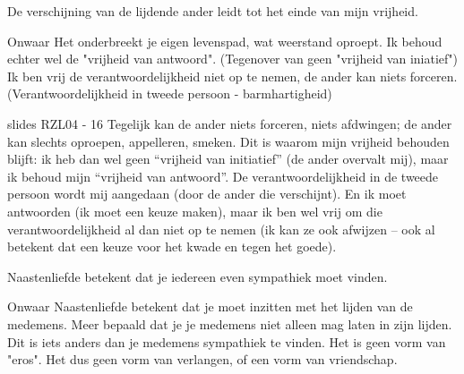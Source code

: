 \documentclass[main.tex]{subfiles}
\begin{document}
\begin{examenvraag}
    \begin{stelling}
        De verschijning van de lijdende ander leidt tot het einde van mijn vrijheid.
    \end{stelling}

	 \begin{stelling-antwoord}{Onwaar}
		Het onderbreekt je eigen levenspad, wat weerstand oproept.
		Ik behoud echter wel de "vrijheid van antwoord". (Tegenover van geen "vrijheid van iniatief")
		Ik ben vrij de verantwoordelijkheid niet op te nemen, de ander kan niets forceren.
		(Verantwoordelijkheid in tweede persoon - barmhartigheid)
		
	 \begin{citaat}{slides RZL04 - 16}
Tegelijk kan de ander niets forceren, niets afdwingen; de ander kan slechts oproepen, appelleren, smeken.
Dit is waarom mijn vrijheid behouden blijft: ik heb dan wel geen “vrijheid van initiatief” (de ander overvalt mij), 
maar ik behoud mijn “vrijheid van antwoord”.
De verantwoordelijkheid in de tweede persoon wordt mij aangedaan (door de ander die verschijnt).
En ik moet antwoorden (ik moet een keuze maken), maar ik ben wel vrij om die verantwoordelijkheid al dan niet op te nemen (ik kan ze ook afwijzen – ook al betekent dat een keuze voor het kwade en tegen het goede).
        \end{citaat}
		
    \end{stelling-antwoord}
\end{examenvraag}


\begin{examenvraag}
    \begin{stelling}
        Naastenliefde betekent dat je iedereen even sympathiek moet vinden.
    \end{stelling}

    \begin{stelling-antwoord}{Onwaar}
        Naastenliefde betekent dat je moet inzitten met het lijden van de medemens.
        Meer bepaald dat je je medemens niet alleen mag laten in zijn lijden.
        Dit is iets anders dan je medemens sympathiek te vinden.
        Het is geen vorm van "eros".
        Het dus geen vorm van verlangen, of een vorm van vriendschap.
    \end{stelling-antwoord}
\end{examenvraag}
\end{document}
